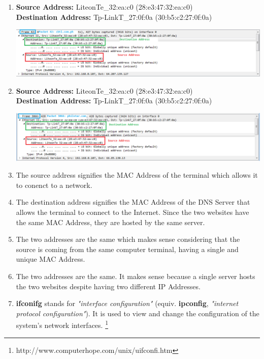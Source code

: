 \documentclass[11pt]{article}
\begin{document}
\begin{enumerate}
\item
\textbf{Source Address:} LiteonTe\_32:ea:c0 (28:e3:47:32:ea:c0) \\
\textbf{Destination Address:} Tp-LinkT\_27:0f:0a (30:b5:c2:27:0f:0a)
\begin{center}
\includegraphics[scale=0.5]{Q3}
\end{center}

\item
\textbf{Source Address:} LiteonTe\_32:ea:c0 (28:e3:47:32:ea:c0) \\
\textbf{Destination Address:} Tp-LinkT\_27:0f:0a (30:b5:c2:27:0f:0a)
\begin{center}
\includegraphics[scale=0.5]{Q4}
\end{center}

\item
The source address signifies the MAC Address of the terminal which allows it to conenct to a network.

\item
The destination address signifies the MAC Address of the DNS Server that allows the terminal to connect to the Internet. Since the two websites have the same MAC Address, they are hosted by the same server.

\item
The two addresses are the same which makes sense considering that the source is coming from the same computer terminal, having a single and unique MAC Address.

\item
The two addresses are the same. It makes sense because a single server hosts the two websites despite having two different IP Addresses.

\item
\textbf{ifconifg} stands for \textit{"interface configuration"} (equiv. \textbf{ipconfig}, \textit{"internet protocol configuration"}). It is used to view and change the configuration of the system's network interfaces. \footnote{http://www.computerhope.com/unix/uifconfi.htm}


\end{enumerate}
\end{document}
